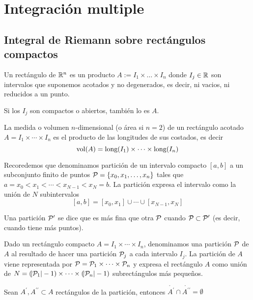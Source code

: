 \chapter{Integración multiple}


\section{Integral de Riemann sobre rectángulos compactos}

\begin{defi}
	Un rectángulo de $\mathbb{R}^n$ es un producto $A := I_1 \times \dots \times I_n$
	donde $I_j \in \mathbb{R}$ son intervalos que suponemos acotados y no degenerados,
	es decir, ni vacios, ni reducidos a un punto.
	
	Si los $I_j$ son compactos o abiertos, también lo es $A$.
\end{defi}

\begin{defi}
	La medida o volumen $n$-dimensional (o área si $n=2$) de un rectángulo
	acotado $A = I_1 \times \cdots \times I_n$ es el producto de las longitudes
	de sus costados, es decir
	\[
		\operatorname{vol}(A) = \text{long} (I_1) \times \dots \times \text{long} (I_n)
	\]
\end{defi}

\begin{obs}
	Recoredemos que denominamos partición de un intervalo compacto $[a,b]$ a un
	subconjunto finito de puntos $\mathcal{P}=\left\{x_0,x_1,\dots,x_n\right\}$ tales que
	$a = x_0 < x_1 < \cdots < x_{N-1} < x_N = b$. La partición expresa el intervalo
	como la unión de $N$ subintervalos
	\[
		[a,b] = [x_0,x_1] \cup \cdots \cup [x_{N-1},x_N]
	\]
\end{obs}
\begin{obs*}
	Una partición $\mathcal{P}^\prime$ se dice que es más fina que otra
	$\mathcal{P}$ cuando $\mathcal{P} \subset \mathcal{P}^\prime$ (es decir, cuando
	tiene más puntos).
\end{obs*}

\begin{defi}
	Dado un rectángulo compacto $A = I_1 \times \cdots \times I_n$, denominamos
	una partición $\mathcal{P}$ de $A$ al resultado de hacer una partición $\mathcal{P}_j$ a cada
	intervalo $I_j$.
	La partición de $A$ viene representada por $\mathcal{P} = \mathcal{P}_1 \times \cdots \times
	\mathcal{P}_n$ y expresa el rectángulo $A$ como unión de $N = (\abs{\mathcal{P}_1}-1) \times
	\cdots \times (\abs{\mathcal{P}_n}-1)$ subrectángulos más pequeños.
\end{defi}

\begin{obs*}
	Sean $A^\prime,A^{\prime\prime}\subset A$ rectángulos de la partición, entonces
	$\mathring{A^\prime} \cap \mathring{A^{\prime\prime}} = \emptyset$
\end{obs*}

